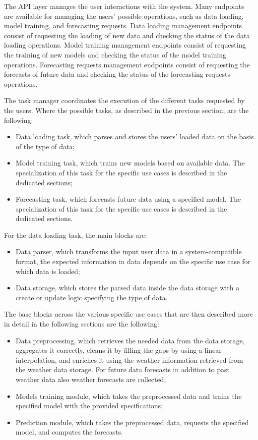 The API layer manages the user interactions with the system.
Many endpoints are available for managing the users' possible operations, such as data loading, model training, and forecasting requests.
Data loading management endpoints consist of requesting the loading of new data and checking the status of the data loading operations.
Model training management endpoints consist of requesting the training of new models and checking the status of the model training operations.
Forecasting requests management endpoints consist of requesting the forecasts of future data and checking the status of the forecasting requests operations.

The task manager coordinates the execution of the different tasks requested by the users.
Where the possible tasks, as described in the previous section, are the following:
\begin{itemize}
  \item Data loading task, which parses and stores the users' loaded data on the basis of the type of data;
  \item Model training task, which trains new models based on available data. The specialization of this task for the specific use cases is described in the dedicated sections;
  \item Forecasting task, which forecasts future data using a specified model. The specialization of this task for the specific use cases is described in the dedicated sections.
\end{itemize}

For the data loading task, the main blocks are:
\begin{itemize}
  \item Data parser, which transforms the input user data in a system-compatible format, the expected information in data depends on the specific use case for which data is loaded;
  \item Data storage, which stores the parsed data inside the data storage with a create or update logic specifying the type of data.
\end{itemize}

The base blocks across the various specific use cases that are then described more in detail in the following sections are the following:
\begin{itemize}
  \item Data preprocessing, which retrieves the needed data from the data storage, aggregates it correctly, cleans it by filling the gaps by using a linear interpolation, and enriches it using the weather information retrieved from the weather data storage. For future data forecasts in addition to past weather data also weather forecasts are collected;
  \item Models training module, which takes the preprocessed data and trains the specified model with the provided specifications;
  \item Prediction module, which takes the preprocessed data, requests the specified model, and computes the forecasts.
\end{itemize}

